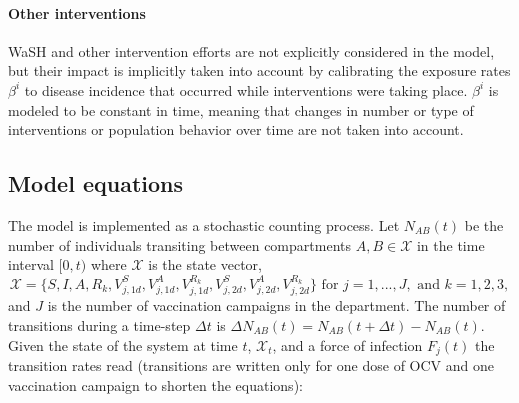 \paragraph{Other interventions} WaSH and other intervention efforts are not explicitly considered in the model, but their impact is implicitly taken into account by calibrating the exposure rates $\beta^i$ to disease incidence that occurred while interventions were taking place. $\beta^i$ is modeled to be constant in time, meaning that changes in number or type of interventions or population behavior over time are not taken into account. %


\subsection{Model equations}\label{sec:stoch}
The model is implemented as a stochastic counting process\cite{Breto:TimeSeriesAnalysis:2009}. Let \(N_{AB}(t)\) be the number of individuals transiting between compartments \(A,B\in \mathcal{X}\) in the time interval \([0,t)\)  where $\mathcal{X}$ is the state vector,
$$\mathcal{X} = \{S, I, A, R_k, V^S_{j,1d},V^A_{j,1d}, V^{R_k}_{j,1d}, V^S_{j,2d},V^A_{j,2d}, V^{R_k}_{j,2d}\} 
\text{ for } j = 1, ..., J, \text{ and } k = 1, 2, 3,
$$
and $J$ is the number of vaccination campaigns in the department.
The number of transitions during a time-step $\Delta t$ is
\(\Delta N_{AB}(t) = N_{AB}(t+\Delta t) - N_{AB}(t)\). Given the state of the system at time \(t\), \(\mathcal{X}_t\), and a force of infection $F_j(t)$ the transition rates read (transitions are written only for one dose of OCV and one vaccination campaign to shorten the equations):
